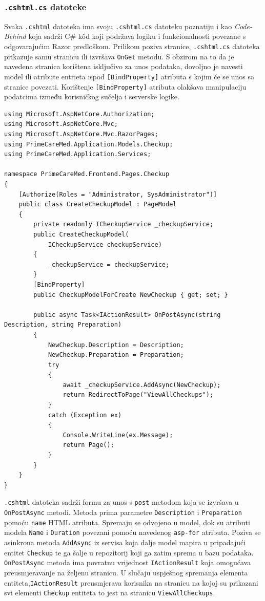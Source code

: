 \subsubsection{\texttt{.cshtml.cs} datoteke}
\label{subsubsec:.cshtml.cs}
Svaka \texttt{.cshtml} datoteka ima svoju \texttt{.cshtml.cs} datoteku poznatiju i kao \textit{Code-Behind} koja sadrži C\# k\^od koji podržava logiku i funkcionalnosti povezane s odgovarajućim Razor predloškom. Prilikom poziva stranice, \texttt{.cshtml.cs} datoteka prikazuje samu stranicu ili izvršava \texttt{OnGet} metodu. S obzirom na to da je navedena stranica korištena isključivo za unos podataka, dovoljno je navesti model ili atribute entiteta ispod \texttt{[BindProperty]} atributa s kojim će se unos sa stranice povezati. Korištenje \texttt{[BindProperty]} atributa olakšava manipulaciju podatcima između korisničkog sučelja i serverske logike.

\begin{lstlisting}[caption={\texttt{CreateCheckup.cshtml.cs} datoteka}, label=createCheckupCs]
using Microsoft.AspNetCore.Authorization;
using Microsoft.AspNetCore.Mvc;
using Microsoft.AspNetCore.Mvc.RazorPages;
using PrimeCareMed.Application.Models.Checkup;
using PrimeCareMed.Application.Services;

namespace PrimeCareMed.Frontend.Pages.Checkup
{
    [Authorize(Roles = "Administrator, SysAdministrator")]
    public class CreateCheckupModel : PageModel
    {
        private readonly ICheckupService _checkupService;
        public CreateCheckupModel(
            ICheckupService checkupService)
        {
            _checkupService = checkupService;
        }
        [BindProperty]
        public CheckupModelForCreate NewCheckup { get; set; }

        public async Task<IActionResult> OnPostAsync(string Description, string Preparation)
        {
            NewCheckup.Description = Description;
            NewCheckup.Preparation = Preparation;
            try
            {
                await _checkupService.AddAsync(NewCheckup);
                return RedirectToPage("ViewAllCheckups");
            }
            catch (Exception ex)
            {
                Console.WriteLine(ex.Message);
                return Page();
            }   
        }
    }
}
\end{lstlisting}

\texttt{.cshtml} datoteka sadrži formu za unos s \texttt{post} metodom koja se izvršava u \\\texttt{OnPostAsync} metodi. Metoda prima parametre \texttt{Description} i \texttt{Preparation} pomoću \texttt{name} HTML atributa. Spremaju se odvojeno u model, dok su atributi modela \texttt{Name} i \texttt{Duration} povezani pomoću navedenog \texttt{asp-for} atributa. Poziva se asinkrona metoda \texttt{AddAsync} iz servisa koja dalje model mapira u pripadajući entitet \texttt{Checkup} te ga šalje u repozitorij koji ga zatim sprema u bazu podataka. \texttt{OnPostAsync} metoda ima povratnu vrijednost \texttt{IActionResult} koja omogućava preusmjeravanje na željenu stranicu. U slučaju uspješnog spremanja elementa entiteta,\texttt{IActionResult} preusmjerava korisnika na stranicu na kojoj su prikazani svi elementi \texttt{Checkup} entiteta to jest na stranicu \texttt{ViewAllCheckups}.


